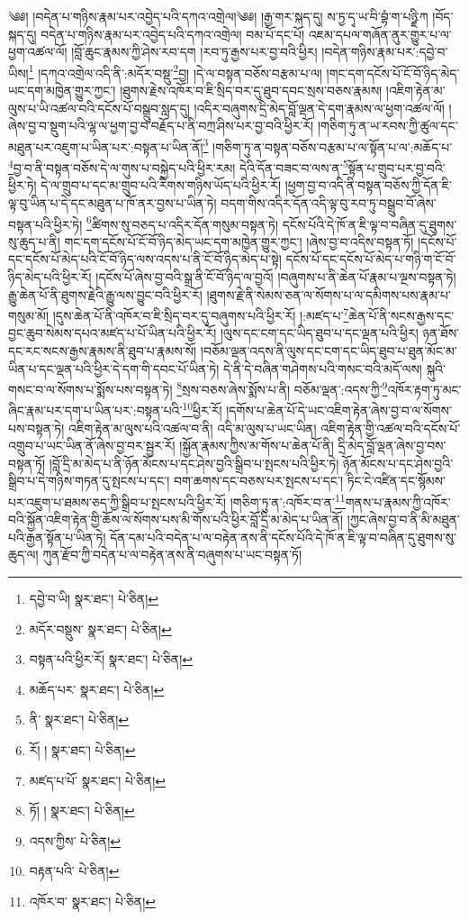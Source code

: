 \setcounter{footnote}{0} 
༄༅། །བདེན་པ་གཉིས་རྣམ་པར་འབྱེད་པའི་དཀའ་འགྲེལ།༄༅། །རྒྱ་གར་སྐད་དུ། ས་ཏྱ་དྭ་ཡ་བི་བྷཾ་ག་པཉྫི་ཀ །བོད་སྐད་དུ། བདེན་པ་གཉིས་རྣམ་པར་འབྱེད་པའི་དཀའ་འགྲེལ། བམ་པོ་དང་པོ། འཇམ་དཔལ་གཞོན་ནུར་གྱུར་པ་ལ་ཕྱག་འཚལ་ལོ། །བློ་ཆུང་རྣམས་ཀྱི་ཤེས་རབ་དག །རབ་ཏུ་རྒྱས་པར་བྱ་བའི་ཕྱིར། །བདེན་གཉིས་རྣམ་པར་:དབྱེ་བ་ཡིས།\footnote{དབྱེ་བ་ཡི།  སྣར་ཐང་།  པེ་ཅིན། } །དཀའ་འགྲེལ་འདི་ནི་:མདོར་བསྡུ་\footnote{མདོར་བསྡུས་  སྣར་ཐང་།  པེ་ཅིན། }བྱ། །དེ་ལ་བསྟན་བཅོས་བརྩམ་པ་ལ། །གང་དག་དངོས་པོ་ངོ་བོ་ཉིད་མེད་ཡང་དག་མཁྱེན་གྱུར་ཀྱང་། །ཐུགས་རྗེས་འཁོར་བ་ཇི་སྲིད་བར་དུ་ཐུབ་དབང་སྲས་བཅས་རྣམས། །འཇིག་རྟེན་མ་ལུས་པ་ཡི་འཚལ་བའི་དངོས་པོ་བསྒྲུབ་སླད་དུ། །འདིར་བཞུགས་དྲི་མེད་བློ་ལྡན་དེ་དག་རྣམས་ལ་ཕྱག་འཚལ་ལོ། །ཞེས་བྱ་བ་སྡུག་པའི་ལྷ་ལ་ཕྱག་བྱ་བ་བརྗོད་པ་ནི་བཀྲ་ཤིས་པར་བྱ་བའི་ཕྱིར་རོ། །གཅིག་ཏུ་ན་ཡ་རབས་ཀྱི་ཚུལ་དང་མཐུན་པར་འཇུག་པ་ཡིན་པར་:བསྟན་པ་ཡིན་ནོ།\footnote{བསྟན་པའི་ཕྱིར་རོ།  སྣར་ཐང་།  པེ་ཅིན། } །གཅིག་ཏུ་ན་བསྟན་བཅོས་བརྩམ་པ་ལ་སྟོན་པ་ལ་:མཆོད་པ་\footnote{མཆོད་པར་  སྣར་ཐང་།  པེ་ཅིན། }བྱ་བ་ནི་བསྟན་བཅོས་དེ་ལ་གུས་པ་བསྐྱེད་པའི་ཕྱིར་རམ། དེའི་དོན་བཟང་བ་ལས་ན་\footnote{ནི་  སྣར་ཐང་།  པེ་ཅིན། }སྟོན་པ་གྲུབ་པར་བྱ་བའི་ཕྱིར་ཏེ། དེ་ལ་གྲུབ་པ་དང་མ་གྲུབ་པའི་རིགས་གཉིས་ཡོད་པའི་ཕྱིར་རོ། །ཕྱག་བྱ་བ་འདི་ནི་བསྟན་བཅོས་ཀྱི་དོན་ཇི་ལྟ་བུ་ཡིན་པ་དེ་དང་མཐུན་པ་ཁོ་ནར་བྱས་པ་ཡིན་ཏེ། བདག་གིས་འདིར་དོན་འདི་ལྟ་བུ་རབ་ཏུ་བསྒྲུབ་བོ་ཞེས་བསྟན་པའི་ཕྱིར་ཏེ། \footnote{རོ། །   སྣར་ཐང་།  པེ་ཅིན། }ཚིགས་སུ་བཅད་པ་འདིར་དོན་གསུམ་བསྟན་ཏེ། དངོས་པོའི་དེ་ཁོ་ན་ཇི་ལྟ་བ་བཞིན་དུ་ཐུགས་སུ་ཆུད་པ་ནི། གང་དག་དངོས་པོ་ངོ་བོ་ཉིད་མེད་ཡང་དག་མཁྱེན་གྱུར་ཀྱང་། །ཞེས་བྱ་བ་འདིས་བསྟན་ཏོ། །དངོས་པོ་དང་དངོས་པོ་མེད་པའི་ངོ་བོ་ཉིད་ལས་འདས་པ་ནི་ངོ་བོ་ཉིད་མེད་པ་སྟེ། དངོས་པོ་དང་དངོས་པོ་མེད་པ་གཉི་ག་ངོ་བོ་ཉིད་མེད་པའི་ཕྱིར་རོ། །དངོས་པོ་ཞེས་བྱ་བའི་སྒྲ་ནི་ངོ་བོ་ཉིད་ལ་བྱའོ། །བཞུགས་པ་ནི་ཆེན་པོ་རྣམ་པ་ལྔས་བསྟན་ཏེ། རྒྱུ་ཆེན་པོ་ནི་ཐུགས་རྗེའི་རྒྱུ་ལས་བྱུང་བའི་ཕྱིར་རོ། །ཐུགས་རྗེ་ནི་སེམས་ཅན་ལ་སོགས་པ་ལ་དམིགས་པས་རྣམ་པ་གསུམ་མོ། །དུས་ཆེན་པོ་ནི་འཁོར་བ་ཇི་སྲིད་བར་དུ་བཞུགས་པའི་ཕྱིར་རོ། །:མཛད་པ་\footnote{མཛད་པ་པོ་  སྣར་ཐང་།  པེ་ཅིན། }ཆེན་པོ་ནི་སངས་རྒྱས་དང་བྱང་ཆུབ་སེམས་དཔའ་མཛད་པ་པོ་ཡིན་པའི་ཕྱིར་རོ། །ལུས་དང་ངག་དང་ཡིད་ཐུབ་པ་དང་ལྡན་པའི་ཕྱིར། ཉན་ཐོས་དང་རང་སངས་རྒྱས་རྣམས་ནི་ཐུབ་པ་རྣམས་སོ། །བཅོམ་ལྡན་འདས་ནི་ལུས་དང་ངག་དང་ཡིད་ཐུབ་པ་ཐུན་མོང་མ་ཡིན་པ་དང་ལྡན་པའི་ཕྱིར་དེ་དག་གི་དབང་པོ་ཡིན་ཏེ། དེ་ནི་དེ་བཞིན་གཤེགས་པའི་གསང་བའི་མདོ་ལས། སྐུའི་གསང་བ་ལ་སོགས་པ་སྨོས་པས་བསྟན་ཏེ། \footnote{ཏོ། །   སྣར་ཐང་།  པེ་ཅིན། }སྲས་བཅས་ཞེས་སྨོས་པ་ནི། བཅོམ་ལྡན་:འདས་ཀྱི་\footnote{འདས་ཀྱིས་  པེ་ཅིན། }འཁོར་རྟག་ཏུ་མང་ཞིང་རྣམ་པར་དག་པ་ཡིན་པར་:བསྟན་པའི་\footnote{བརྟན་པའི་  པེ་ཅིན། }ཕྱིར་རོ། །དགོས་པ་ཆེན་པོ་དེ་ཡང་འཇིག་རྟེན་ཞེས་བྱ་བ་ལ་སོགས་པས་བསྟན་ཏེ། འཇིག་རྟེན་མ་ལུས་པའི་འཚལ་བ་ནི། འདི་མ་ལུས་པ་ཡང་ཡིན། འཇིག་རྟེན་གྱི་འཚལ་བའི་དངོས་པོ་འགྲུབ་པ་ཡང་ཡིན་ནོ་ཞེས་བྱ་བར་སྦྱར་རོ། །སྐྱོན་རྣམས་ཀྱིས་མ་གོས་པ་ཆེན་པོ་ནི། དྲི་མེད་བློ་ལྡན་ཞེས་བྱ་བས་བསྟན་ཏོ། །བློ་དྲི་མ་མེད་པ་ནི་ཉོན་མོངས་པ་དང་ཤེས་བྱའི་སྒྲིབ་པ་སྤངས་པའི་ཕྱིར་ཏེ། ཉོན་མོངས་པ་དང་ཤེས་བྱའི་སྒྲིབ་པ་དེ་གཉིས་གཏན་དུ་སྤངས་པ་དང་། བག་ཆགས་དང་བཅས་པར་སྤངས་པ་དང་། ཏིང་ངེ་འཛིན་དང་སྙོམས་པར་འཇུག་པ་ཐམས་ཅད་ཀྱི་སྒྲིབ་པ་སྤངས་པའི་ཕྱིར་རོ། །གཅིག་ཏུ་ན་:འཁོར་བ་ན་\footnote{འཁོར་བ་  སྣར་ཐང་།  པེ་ཅིན། }གནས་པ་རྣམས་ཀྱི་འཁོར་བའི་སྐྱོན་འཇིག་རྟེན་གྱི་ཆོས་ལ་སོགས་པས་མི་གོས་པའི་ཕྱིར་བློ་དྲི་མ་མེད་པ་ཡིན་ནོ། །ཀྱང་ཞེས་བྱ་བ་ནི་མི་མཐུན་པའི་རྒྱན་སྟོན་པ་ཡིན་ཏེ། དོན་དམ་པའི་བདེན་པ་ལ་བརྟེན་ནས་ནི་དངོས་པོའི་དེ་ཁོ་ན་ཇི་ལྟ་བ་བཞིན་དུ་ཐུགས་སུ་ཆུད་ལ། ཀུན་རྫོབ་ཀྱི་བདེན་པ་ལ་བརྟེན་ནས་ནི་བཞུགས་པ་ཡང་བསྟན་ཏོ། 
